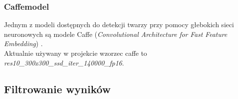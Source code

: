 \documentclass[10pt, a4paper]{article}
\begin{document}
\subsubsection{Caffemodel}
Jednym z modeli dostępnych do detekcji twarzy przy pomocy głebokich sieci neuronowych są modele Caffe (\textit{Convolutional Architecture for Fast Feature Embedding}) \cite{jia2014caffe}.\\
Aktualnie używany w projekcie wzorzec caffe to \\\textit{res10{\_}300x300{\_}ssd{\_}iter{\_}140000{\_}fp16}.


\subsection{Filtrowanie wyników}
\label{section:face_detection_filter}
\end{document}
